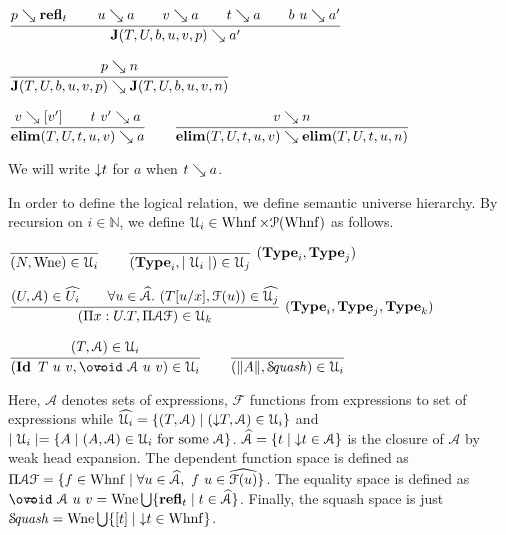\documentclass[a4paper,english]{lipics-utf8x}
\begin{document}
  \begin{center}
  \(
    \ru{p \rew \refl_t \qquad
        u \rew a \qquad
        v \rew a \qquad
        t \rew a \qquad
        b\ u \rew a'
      }{\J (T,U,b,u,v,p) \rew a'}
  \)
  \end{center}

  \begin{center}
  \(
    \ru{p \rew n
      }{\J (T,U,b,u,v,p) \rew \J (T,U,b,u,v,n)}
  \)
  \end{center}

  \begin{center}
  \(
    \ru{v \rew [v'] \qquad
        t\ v' \rew a
      }{\elim(T,U,t,u,v) \rew a}
    \qquad
    \ru{v \rew n
      }{\elim(T,U,t,u,v) \rew \elim(T,U,t,u,n)}
  \)
  \end{center}
  We will write ${\downarrow} t$ for $a$ when $t \searrow a$.


  In order to define the logical relation, we define semantic universe
  hierarchy.
  By recursion on $i \in \mathbb{N}$, we define
  $\mathcal{U}_i \in \operatorname{Whnf} \times \mathcal{P}(\operatorname{Whnf})$ as follows.

  \begin{center}
  \(
    \ru{}{(N, \Wne) \in \U_i}
    \qquad
    \rux{}{(\Type_i, \mid \U_i \mid) \in \U_j}{(\Type_i,\Type_j)}
  \)
  \end{center}

  \begin{center}
  \(
    \rux{(U, \mathcal{A}) \in \widehat{U_i} \qquad
         \forall u \in \widehat{\mathcal{A}}.\ (T[u/x],\mathcal{F}(u)) \in
         \widehat{\U_j}
       }{(\Pi x:U.T, \Pi \mathcal{A} \mathcal{F}) \in \U_k
       }{(\Type_i, \Type_j, \Type_k)}
  \)
  \end{center}

  \begin{center}
  \(
    \ru{(T,\mathcal{A}) \in \U_i
      }{(\Id T\ u\ v, \oeq\ \mathcal{A}\ u\ v) \in \U_i}
    \qquad
    \ru{}{(\squash{A}, \Squash) \in \U_i}
  \)
  \end{center}

  \noindent %
  Here, $\mathcal{A}$ denotes sets of expressions, $\mathcal{F}$ functions from
  expressions to set of expressions while
  $\widehat{\mathcal{U}_i} = \{ (T,\mathcal{A}) \mid ({\downarrow} T, \mathcal{A}) \in \mathcal{U}_i \}$
  and $\mid \mathcal{U}_i \mid = \{ A \mid (A, \mathcal{A}) \in \mathcal{U}_i \text{ for some }
  \mathcal{A} \}$.
  $\widehat{\mathcal{A}} = \{ t \mid {\downarrow} t \in \mathcal{A} \}$ is the closure
  of $\mathcal{A}$ by weak head expansion.
  The dependent function space is defined as
  $\Pi \mathcal{A} \mathcal{F} = \{ f \in \operatorname{Whnf} \mid \forall u \in
  \widehat{\mathcal{A}},\ f~u \in \widehat{\mathcal{F}(u)} \}$.
  The equality space is defined as
  $\oeq\ \mathcal{A}\ u\ v = \Wne \bigcup \{ \refl_t \mid t \in
  \widehat{\mathcal{A}} \}$.
  Finally, the squash space is just
  $\operatorname{\mathcal{S}\!\mathit{quash}} = \operatorname{Wne} \bigcup \{ [t] \mid {\downarrow} t \in \operatorname{Whnf} \}$.
\end{document}
